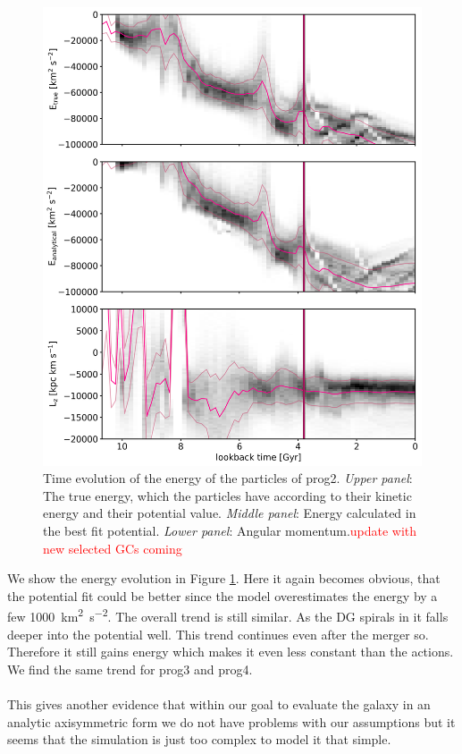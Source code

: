 \begin{figure}[htbp]
\captionsetup{format=plain}
    \centering
	\includegraphics[width=\textwidth]{plots/Dynamics/prog2/energy_time_evolution_hist_mean.png}
	\caption{Time evolution of the energy of the particles of prog2. \textit{Upper panel}: The true energy, which the particles have according to their kinetic energy and their potential value. \textit{Middle panel}: Energy calculated in the best fit potential. \textit{Lower panel}: Angular momentum.\textcolor{red}{update with new selected GCs coming}}\label{fig:energy_time_evolution_prog2}
\end{figure}

We show the energy evolution in Figure \ref{fig:energy_time_evolution_prog2}. Here it again becomes obvious, that the potential fit could be better since the model overestimates the energy by a few \SI{1000}{km^{2}.s^{-2}}. The overall trend is still similar. As the \ac{DG} spirals in it falls deeper into the potential well. This trend continues even after the merger so. Therefore it still gains energy which makes it even less constant than the actions. We find the same trend for prog3 and prog4. 
\\\\This gives another evidence that within our goal to evaluate the galaxy in an analytic axisymmetric form we do not have problems with our assumptions but it seems that the simulation is just too complex to model it that simple.


